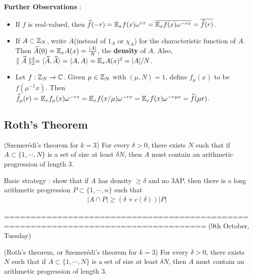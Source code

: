 \documentclass[10pt,a4paper]{report}
\renewcommand{\hat}{\widehat}
\begin{document}
\textbf{Further Observations} :

\begin{itemize}
\item If $f$ is real-valued, then $\hat{f}(-r) = \avg_x f(x) \omega^{rx} = \bar{\avg_x f(x) \omega^{-rx}} = \overline{ \hat{f}(r) }$.

\item If $A\subset \mathbb{Z}_N$, write $A$(instead of $1_A$ or $\chi_A$) for the characteristic function of $A$. Then $\hat{A}(0) = \avg_x A(x) = \frac{|A|}{N}$, the \textbf{density} of $A$. Also, $\norms{\hat{A}}{2}^2 = \langle \hat{A}, \hat{A} \rangle = \langle A,A \rangle = \avg_x A(x)^2 = |A|/N$.

\item Let $f: \mathbb{Z}_N \rightarrow \mathbb{C}$. Given $\mu \in \mathbb{Z}_N$ with $(\mu, N)=1$, define $f_{\mu}(x)$ to be $f(\mu^{-1}x)$. Then $\hat{f}_{\mu}(r) = \avg_x f_{\mu}(x)\omega^{-rx} = \avg_x f(x/\mu) \omega^{-rx} = \avg_x f(x)\omega^{-r\mu x} = \hat{f}(\mu r)$.
\end{itemize}

\subsection*{Roth's Theorem}
\s

(Szemer\'{e}di's theorem for $k=3$) For every $\delta >0$, there exists $N$ such that if $A \subset \{1, \cdots, N\}$ is a set of size at least $\delta N$, then $A$ must contain an arithmetic progression of length 3. 

\s

Basic strategy : show that if $A$ has density $\geq \delta$ and no 3AP, then there is a long arithmetic progression $P \subset \{1,\cdots,n\}$ such that
\begin{align*}
|A\cap P| \geq (\delta + c(\delta)) |P|
\end{align*}

====================================================================================
(9th October, Tuesday)
\s

(Roth's theorem, or Szemer\'{e}di's theorem for $k=3$) For every $\delta >0$, there exists $N$ such that if $A \subset \{1, \cdots, N\}$ is a set of size at least $\delta N$, then $A$ must contain an arithmetic progression of length 3. 
\s
\end{document}

